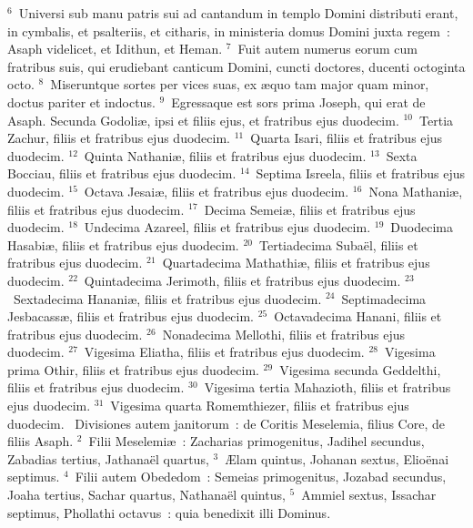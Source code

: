 ${}^{6}$~Universi sub manu patris sui ad cantandum in templo Domini distributi erant, in cymbalis, et psalteriis, et citharis, in ministeria domus Domini juxta regem~: Asaph videlicet, et Idithun, et Heman.
${}^{7}$~Fuit autem numerus eorum cum fratribus suis, qui erudiebant canticum Domini, cuncti doctores, ducenti octoginta octo.
${}^{8}$~Miseruntque sortes per vices suas, ex \ae quo tam major quam minor, doctus pariter et indoctus.
${}^{9}$~Egressaque est sors prima Joseph, qui erat de Asaph. Secunda Godoli\ae , ipsi et filiis ejus, et fratribus ejus duodecim.
${}^{10}$~Tertia Zachur, filiis et fratribus ejus duodecim.
${}^{11}$~Quarta Isari, filiis et fratribus ejus duodecim.
${}^{12}$~Quinta Nathani\ae , filiis et fratribus ejus duodecim.
${}^{13}$~Sexta Bocciau, filiis et fratribus ejus duodecim.
${}^{14}$~Septima Isreela, filiis et fratribus ejus duodecim.
${}^{15}$~Octava Jesai\ae , filiis et fratribus ejus duodecim.
${}^{16}$~Nona Mathani\ae , filiis et fratribus ejus duodecim.
${}^{17}$~Decima Semei\ae , filiis et fratribus ejus duodecim.
${}^{18}$~Undecima Azareel, filiis et fratribus ejus duodecim.
${}^{19}$~Duodecima Hasabi\ae , filiis et fratribus ejus duodecim.
${}^{20}$~Tertiadecima Suba\"el, filiis et fratribus ejus duodecim.
${}^{21}$~Quartadecima Mathathi\ae , filiis et fratribus ejus duodecim.
${}^{22}$~Quintadecima Jerimoth, filiis et fratribus ejus duodecim.
${}^{23}$~Sextadecima Hanani\ae , filiis et fratribus ejus duodecim.
${}^{24}$~Septimadecima Jesbacass\ae , filiis et fratribus ejus duodecim.
${}^{25}$~Octavadecima Hanani, filiis et fratribus ejus duodecim.
${}^{26}$~Nonadecima Mellothi, filiis et fratribus ejus duodecim.
${}^{27}$~Vigesima Eliatha, filiis et fratribus ejus duodecim.
${}^{28}$~Vigesima prima Othir, filiis et fratribus ejus duodecim.
${}^{29}$~Vigesima secunda Geddelthi, filiis et fratribus ejus duodecim.
${}^{30}$~Vigesima tertia Mahazioth, filiis et fratribus ejus duodecim.
${}^{31}$~Vigesima quarta Romemthiezer, filiis et fratribus ejus duodecim.
~\lettrine[lines=10,image=true,loversize=0.05,lraise=-0.03]{D}{}ivisiones autem janitorum~: de Coritis Meselemia, filius Core, de filiis Asaph.
${}^{2}$~Filii Meselemi\ae~: Zacharias primogenitus, Jadihel secundus, Zabadias tertius, Jathana\"el quartus,
${}^{3}$~\AE lam quintus, Johanan sextus, Elio\"enai septimus.
${}^{4}$~Filii autem Obededom~: Semeias primogenitus, Jozabad secundus, Joaha tertius, Sachar quartus, Nathana\"el quintus,
${}^{5}$~Ammiel sextus, Issachar septimus, Phollathi octavus~: quia benedixit illi Dominus.

